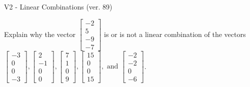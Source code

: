 \begin{exercise}
  \begin{exerciseTitle}V2 - Linear Combinations (ver. 89)\end{exerciseTitle}
  \begin{exerciseStatement}
    Explain why the vector \(\left[\begin{array}{c}
-2 \\
5 \\
-9 \\
-7
\end{array}\right]\)  is or is not a linear 
	combination of the vectors \(\left[\begin{array}{c}
-3 \\
0 \\
0 \\
-3
\end{array}\right] , \left[\begin{array}{c}
2 \\
-1 \\
0 \\
0
\end{array}\right] , \left[\begin{array}{c}
7 \\
1 \\
0 \\
9
\end{array}\right] , \left[\begin{array}{c}
15 \\
0 \\
0 \\
15
\end{array}\right] , \text{ and } \left[\begin{array}{c}
-2 \\
-2 \\
0 \\
-6
\end{array}\right]\).
	



\end{exerciseStatement}
\end{exercise}
